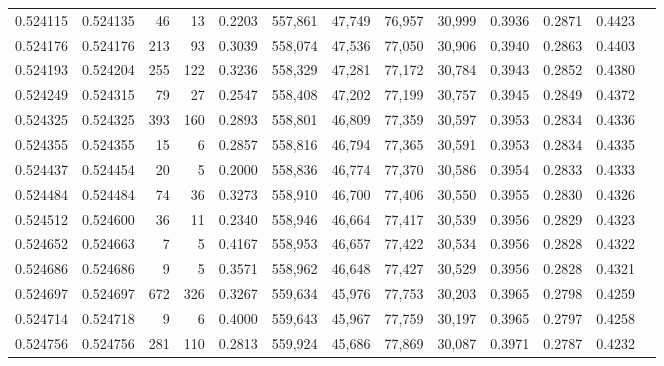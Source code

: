 \begin{tabular}{rrrrrrrrrrrrr}
0.524115 & 0.524135 &    46 &    13 &                                     0.2203 & 557,861 &  47,749 &  76,957 &  30,999 & 0.3936 & 0.2871 & 0.4423 \\
0.524176 & 0.524176 &   213 &    93 &                                     0.3039 & 558,074 &  47,536 &  77,050 &  30,906 & 0.3940 & 0.2863 & 0.4403 \\
0.524193 & 0.524204 &   255 &   122 &                                     0.3236 & 558,329 &  47,281 &  77,172 &  30,784 & 0.3943 & 0.2852 & 0.4380 \\
0.524249 & 0.524315 &    79 &    27 &                                     0.2547 & 558,408 &  47,202 &  77,199 &  30,757 & 0.3945 & 0.2849 & 0.4372 \\
0.524325 & 0.524325 &   393 &   160 &                                     0.2893 & 558,801 &  46,809 &  77,359 &  30,597 & 0.3953 & 0.2834 & 0.4336 \\
0.524355 & 0.524355 &    15 &     6 &                                     0.2857 & 558,816 &  46,794 &  77,365 &  30,591 & 0.3953 & 0.2834 & 0.4335 \\
0.524437 & 0.524454 &    20 &     5 &                                     0.2000 & 558,836 &  46,774 &  77,370 &  30,586 & 0.3954 & 0.2833 & 0.4333 \\
0.524484 & 0.524484 &    74 &    36 &                                     0.3273 & 558,910 &  46,700 &  77,406 &  30,550 & 0.3955 & 0.2830 & 0.4326 \\
0.524512 & 0.524600 &    36 &    11 &                                     0.2340 & 558,946 &  46,664 &  77,417 &  30,539 & 0.3956 & 0.2829 & 0.4323 \\
0.524652 & 0.524663 &     7 &     5 &                                     0.4167 & 558,953 &  46,657 &  77,422 &  30,534 & 0.3956 & 0.2828 & 0.4322 \\
0.524686 & 0.524686 &     9 &     5 &                                     0.3571 & 558,962 &  46,648 &  77,427 &  30,529 & 0.3956 & 0.2828 & 0.4321 \\
0.524697 & 0.524697 &   672 &   326 &                                     0.3267 & 559,634 &  45,976 &  77,753 &  30,203 & 0.3965 & 0.2798 & 0.4259 \\
0.524714 & 0.524718 &     9 &     6 &                                     0.4000 & 559,643 &  45,967 &  77,759 &  30,197 & 0.3965 & 0.2797 & 0.4258 \\
0.524756 & 0.524756 &   281 &   110 &                                     0.2813 & 559,924 &  45,686 &  77,869 &  30,087 & 0.3971 & 0.2787 & 0.4232 \\

\end{tabular}

